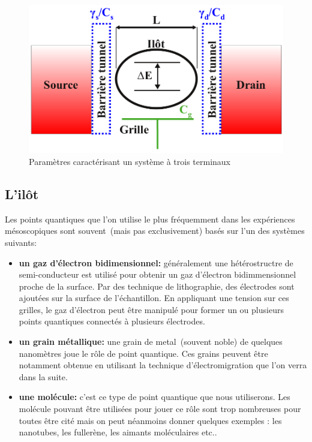 \begin{figure}
\includegraphics[scale=1]{Theorie/Transport/figure1/figure1ThTr.pdf} 
\caption{Paramètres caractérisant un système à trois terminaux}
\label{description_systeme}
\end{figure}



\subsection{L'il\^ot}
Les points quantiques que l'on utilise le plus fréquemment dans les expériences mésoscopiques sont souvent~(mais pas exclusivement) basés sur l'un des systèmes suivants:
\begin{itemize}
\item \textbf{un gaz d'électron bidimensionnel:} généralement une hétérostructre de semi-conducteur est utilisé pour obtenir un gaz d'électron bidimmensionnel proche de la surface. Par des technique de lithographie, des électrodes sont ajoutées sur la surface de l'échantillon. En appliquant une tension sur ces grilles, le gaz d'électron peut \^etre manipulé pour former un ou plusieurs points quantiques connectés à plusieurs électrodes.
\item \textbf{un grain métallique:} une grain de metal~(souvent noble) de quelques nanomètres joue le rôle de point quantique. Ces grains peuvent \^etre notamment obtenue en utilisant la technique d'électromigration que l'on verra dans la suite.
\item \textbf{une molécule:} c'est ce type de point quantique que nous utiliserons. Les molécule pouvant \^etre utilisées pour jouer ce r\^ole sont trop nombreuses pour toutes \^etre cité mais on peut néanmoins donner quelques exemples : les nanotubes, les fullerène, les aimants moléculaires etc.. \newline
\end{itemize}

